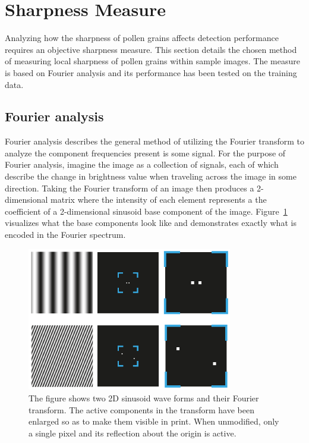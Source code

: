 \section{Sharpness Measure}\label{sec:method-sharpness}
Analyzing how the sharpness of pollen grains affects detection performance requires an objective sharpness measure.
This section details the chosen method of measuring local sharpness of pollen grains within sample images.
The measure is based on Fourier analysis and its performance has been tested on the training data.

\subsection{Fourier analysis}
Fourier analysis describes the general method of utilizing the Fourier transform to analyze the component frequencies present is some signal.
For the purpose of Fourier analysis, imagine the image as a collection of signals, each of which describe the change in brightness value when traveling across the image in some direction.
Taking the Fourier transform of an image then produces a 2-dimensional matrix where the intensity of each element represents a the coefficient of a 2-dimensional sinusoid base component of the image.
Figure~\ref{fig:fourier-sinusoid} visualizes what the base components look like and demonstrates exactly what is encoded in the Fourier spectrum.

\begin{figure}[htbp]
  \centering
  \includegraphics[width=0.8\textwidth]{figs/method/fourier/fourier-sinusoid.pdf}
  \caption[Fourier transform of sinusoid]{The figure shows two 2D sinusoid wave forms and their Fourier transform.
The active components in the transform have been enlarged so as to make them visible in print.
When unmodified, only a single pixel and its reflection about the origin is active.}\label{fig:fourier-sinusoid}
\end{figure}

